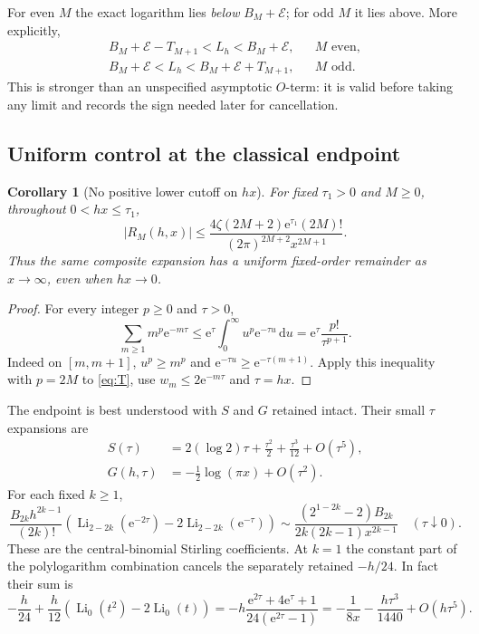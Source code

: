 \documentclass[11pt,a4paper]{article}
\newcommand{\ee}{\mathrm e}
\newcommand{\dd}{\,\mathrm d}
\newcommand{\Li}{\operatorname{Li}}
\newcommand{\E}{\mathcal E}
\numberwithin{equation}{section}
\theoremstyle{plain}
\newtheorem{corollary}[theorem]{Corollary}
\theoremstyle{definition}
\theoremstyle{remark}
\begin{document}
For even $M$ the exact logarithm lies \emph{below} $B_M+\E$; for odd $M$ it
lies above. More explicitly,
\begin{align}
 B_M+\E-T_{M+1}<L_h<B_M+\E,
       &&M\text{ even},\label{eq:evenenv}\\
 B_M+\E<L_h<B_M+\E+T_{M+1},
       &&M\text{ odd}.\label{eq:oddenv}
\end{align}
This is stronger than an unspecified asymptotic $O$-term: it is valid before
taking any limit and records the sign needed later for cancellation.

\subsection{Uniform control at the classical endpoint}
\begin{corollary}[No positive lower cutoff on $hx$]
\label{cor:uniform}
For fixed $\tau_1>0$ and $M\ge0$, throughout $0<hx\le\tau_1$,
\begin{equation}
 |R_M(h,x)|\le
 \frac{4\zeta(2M+2)\ee^{\tau_1}(2M)!}
      {(2\pi)^{2M+2}x^{2M+1}}.
 \label{eq:uniform}
\end{equation}
Thus the same composite expansion has a uniform fixed-order remainder as
$x\to\infty$, even when $hx\to0$.
\end{corollary}
\begin{proof}
For every integer $p\ge0$ and $\tau>0$,
\[
 \sum_{m\ge1}m^p\ee^{-m\tau}
 \le\ee^\tau\int_0^\infty u^p\ee^{-\tau u}\dd u
 =\ee^\tau\frac{p!}{\tau^{p+1}}.
\]
Indeed on $[m,m+1]$, $u^p\ge m^p$ and
$\ee^{-\tau u}\ge\ee^{-\tau(m+1)}$. Apply this inequality with $p=2M$
to \eqref{eq:T}, use $w_m\le2\ee^{-m\tau}$ and $\tau=hx$.
\end{proof}

The endpoint is best understood with $S$ and $G$ retained intact. Their small
$\tau$ expansions are
\begin{align}
 S(\tau)&=2(\log2)\tau+\frac{\tau^2}{2}
                    +\frac{\tau^3}{12}+O(\tau^5),\label{eq:Ssmall}\\
 G(h,\tau)&=-\frac12\log(\pi x)+O(\tau^2).
 \label{eq:Gsmall}
\end{align}
For each fixed $k\ge1$,
\begin{equation}
 \frac{B_{2k}h^{2k-1}}{(2k)!}
 \left(\Li_{2-2k}(\ee^{-2\tau})-2\Li_{2-2k}(\ee^{-\tau})\right)
 \sim\frac{(2^{1-2k}-2)B_{2k}}
 {2k(2k-1)x^{2k-1}}
 \quad(\tau\downarrow0).
 \label{eq:classicalcoefs}
\end{equation}
These are the central-binomial Stirling coefficients. At $k=1$ the constant
part of the polylogarithm combination cancels the separately retained
$-h/24$. In fact their sum is
\begin{equation}
 -\frac h{24}+\frac h{12}\left(\Li_0(t^2)-2\Li_0(t)\right)
 =-h\frac{\ee^{2\tau}+4\ee^\tau+1}{24(\ee^{2\tau}-1)}
 =-\frac1{8x}-\frac{h\tau^3}{1440}+O(h\tau^5).
 \label{eq:firstcoefficient}
\end{equation}
\end{document}
